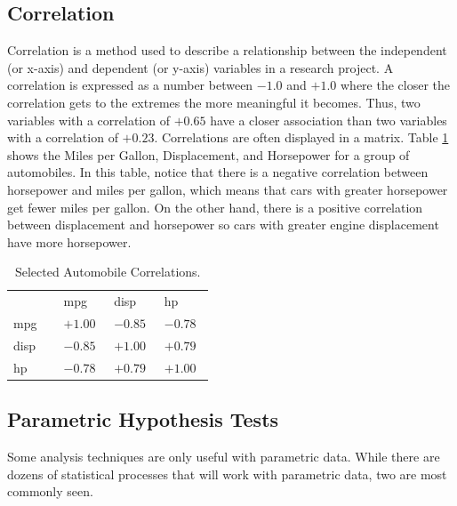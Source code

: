 \subsection{Correlation}

Correlation is a method used to describe a relationship between the independent (or x-axis) and dependent (or y-axis) variables in a research project. A correlation is expressed as a number between $ -1.0 $ and $ +1.0 $ where the closer the correlation gets to the extremes the more meaningful it becomes. Thus, two variables with a correlation of $ +0.65 $ have a closer association than two variables with a correlation of $ +0.23 $. Correlations are often displayed in a matrix. Table \ref{tab06.06} shows the Miles per Gallon, Displacement, and Horsepower for a group of automobiles. In this table, notice that there is a negative correlation between horsepower and miles per gallon, which means that cars with greater horsepower get fewer miles per gallon. On the other hand, there is a positive correlation between displacement and horsepower so cars with greater engine displacement have more horsepower.

\begin{table}[H]
	\centering
	\begin{tabularx}{0.95\linewidth}{
			p{0.22\linewidth}
			p{0.22\linewidth}
			p{0.22\linewidth}
			p{0.22\linewidth}}
		\toprule
		{}   & mpg       & disp      & hp \\
		mpg  & $ +1.00 $ & $ -0.85 $ & $ -0.78 $ \\
		disp & $ -0.85 $ & $ +1.00 $ & $ +0.79 $ \\
		hp   & $ -0.78 $ & $ +0.79 $ & $ +1.00 $ \\
		\bottomrule
	\end{tabularx}
	\caption{Selected Automobile Correlations.}
	\label{tab06.06}
\end{table}


\subsection{Parametric Hypothesis Tests}

Some analysis techniques are only useful with \gls{parametric} data. While there are dozens of statistical processes that will work with parametric data, two are most commonly seen.

